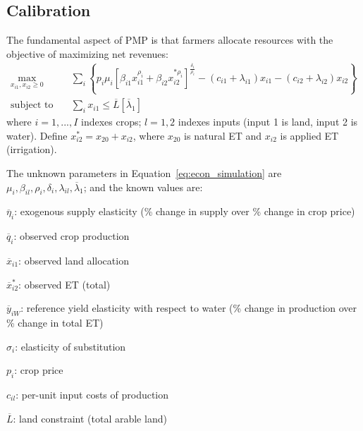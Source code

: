 \documentclass[review]{elsarticle}
\begin{document}
\subsection{Calibration}
The fundamental aspect of PMP is that farmers allocate resources with the objective of maximizing net revenues: 
\begin{equation}\label{eq:econ_simulation}
    \begin{split}
    \max _ { x _ { i 1 } , x _ { i 2 } \geq 0 } & \quad \sum _ { i } \left\{ p _ { i } \mu _ { i } \left[ \beta _ { i 1 } x _ { i 1 } ^ { \rho _ { i } } + \beta _ { i 2 } x _ { i 2 } ^ { * \rho _ { i } } \right] ^ { \frac { \delta _ { i } } { \rho _ { i } } } - \left( c _ { i 1 } + \lambda _ { i 1 } \right) x _ { i 1 } - \left( c _ { i 2 } + \lambda _ { i 2 } \right) x _ { i 2 } \right\} \\
    \text{subject to} & \quad \sum _ { i } x _ { i 1 } \leq \overline { L } \left[ \overline { \lambda } _ { 1 } \right]
    \end{split}
\end{equation}
where $i = 1,...,I$ indexes crops; $l=1,2$ indexes inputs (input 1 is land, input 2 is water). Define $x _ { i 2 } ^ { * } = x _ { 20 } + x _ { i 2 }$, where $x_{20}$ is natural ET and $x_{i2}$ is applied ET (irrigation). 

The unknown parameters in Equation~\ref{eq:econ_simulation} are $\mu _ { i } , \beta _ { i l } , \rho _ { i } , \delta _ { i } , \lambda _ { i l } , \overline { \lambda } _ { 1 }$; and the known values are:

\begin{itemize*}
    \item $\overline { \eta } _ { i }$: exogenous supply elasticity (\% change in supply over \% change in crop price)
    \item $\overline { q } _ { i }$: observed crop production
    \item $\overline { x } _ { i 1 }$: observed land allocation
    \item $\overline { x } _ { i 2} ^{*}$: observed ET (total)
    \item $\overline { y } _ { i W}$: reference yield elasticity with respect to water (\% change in production over \% change in total ET)
    \item $\sigma_i$: elasticity of substitution
    \item $p_i$: crop price
    \item $c_{il}$: per-unit input costs of production
    \item $\overline { L }$: land constraint (total arable land)
\end{itemize*}
\end{document}
